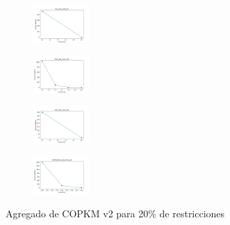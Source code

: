 \begin{figure}[H]
\begin{subfigure}
    \end{subfigure}
    \hfill
    \begin{subfigure}
        \centering
        \includegraphics[width=0.234\textwidth]{img/copkm2/iris_set_const_20_3773969821_cost.png}
    \end{subfigure}
    \hfill
    \begin{subfigure}
        \centering
        \includegraphics[width=0.234\textwidth]{img/copkm2/ecoli_set_const_20_3773969821_cost.png}
    \end{subfigure}
    \hfill
    \begin{subfigure}
        \centering
        \includegraphics[width=0.234\textwidth]{img/copkm2/rand_set_const_20_3773969821_cost.png}
    \end{subfigure}
    \hfill
    \begin{subfigure}
        \centering
        \includegraphics[width=0.234\textwidth]{img/copkm2/newthyroid_set_const_20_3773969821_cost.png}
    \end{subfigure}
    \caption{Agregado de COPKM v2 para 20\% de restricciones}
\end{figure}

\vspace*{\fill}
\newpage